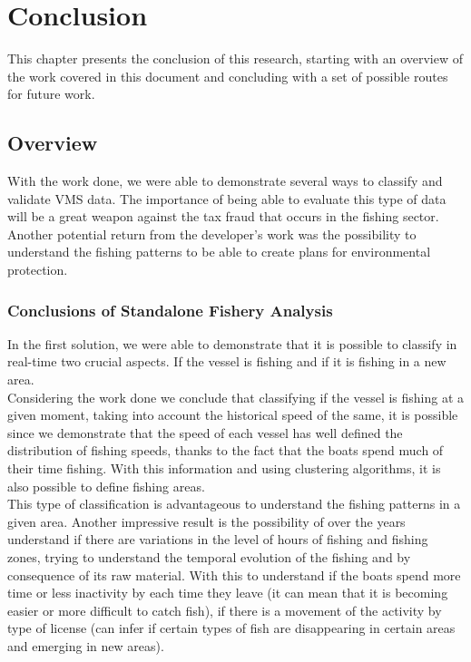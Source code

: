 % 
%  
%
\chapter{Conclusion}
\label{cha:conclusion}


This chapter presents the conclusion of this research, starting with an overview of the work covered in this document and concluding with a set of possible routes for future work.

\section{Overview} %
\label{sec:overview}
With the work done, we were able to demonstrate several ways to classify and validate VMS data. The importance of being able to evaluate this type of data will be a great weapon against the tax fraud that occurs in the fishing sector. Another potential return from the developer's work was the possibility to understand the fishing patterns to be able to create plans for environmental protection.

\subsection{Conclusions of Standalone Fishery Analysis} %
\label{sec:con_sfa}

In the first solution, we were able to demonstrate that it is possible to classify in real-time two crucial aspects. If the vessel is fishing and if it is fishing in a new area.\\
Considering the work done we conclude that classifying if the vessel is fishing at a given moment, taking into account the historical speed of the same, it is possible since we demonstrate that the speed of each vessel has well defined the distribution of fishing speeds, thanks to the fact that the boats spend much of their time fishing.
With this information and using clustering algorithms, it is also possible to define fishing areas.\\

This type of classification is advantageous to understand the fishing patterns in a given area. Another impressive result is the possibility of over the years understand if there are variations in the level of hours of fishing and fishing zones, trying to understand the temporal evolution of the fishing and by consequence of its raw material. With this to understand if the boats spend more time or less inactivity by each time they leave (it can mean that it is becoming easier or more difficult to catch fish), if there is a movement of the activity by type of license (can infer if certain types of fish are disappearing in certain areas and emerging in new areas).


